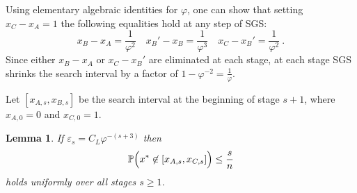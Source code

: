 \documentclass[11pt]{hackednow}
\newtheorem{lemma}{Lemma}[chapter]
\renewcommand{\P}{\mathbb{P}}
\newcommand{\ve}{\varepsilon}
\begin{document}
Using elementary algebraic identities for $\varphi$, one can show that setting $x_C-x_A = 1$ the following equalities hold at any step of SGS:
\begin{equation}
\label{eq:sgs-ratios}
    x_B-x_A = \frac{1}{\varphi^2} \quad x_B'-x_B = \frac{1}{\varphi^3} \quad x_C - x_B' = \frac{1}{\varphi^2}~.
\end{equation}
Since either $x_B-x_A$ or $x_C - x_B'$ are eliminated at each stage, at each stage SGS shrinks the search interval by a factor of $1 - \varphi^{-2} = \tfrac{1}{\varphi}$.

Let $[x_{A,s},x_{B,s}]$ be the search interval at the beginning of stage $s+1$, where $x_{A,0} = 0$ and $x_{C,0} = 1$.
\begin{lemma}
If $\ve_s = C_L\varphi^{-(s+3)}$ then
\[
    \P\Bigl(x^* \not\in [x_{A,s},x_{C,s}]\Bigr) \le \frac{s}{n}
\]
holds uniformly over all stages $s \ge 1$.
\end{lemma}
\end{document}
